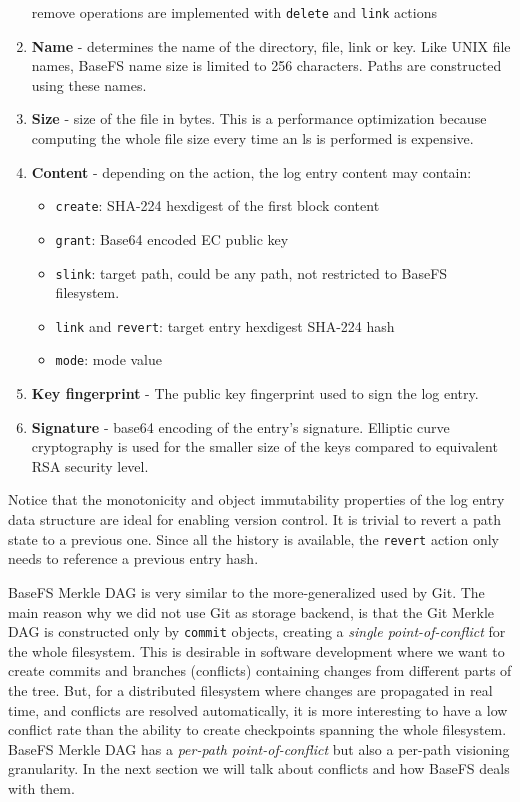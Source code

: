 \documentclass{sig-alternate}
\begin{document}
\begin{enumerate}
remove operations are implemented with \texttt{delete} and \texttt{link} actions
\item \textbf{Name} - determines the name of the directory, file, link or key. Like UNIX file names, BaseFS name size is limited to 256 characters. Paths are constructed using these names.
\item \textbf{Size} - size of the file in bytes. This is a performance optimization because computing the whole file size every time an ls is performed is expensive.
\item \textbf{Content} - depending on the action, the log entry content may contain:
    \begin{itemize}
    \item \texttt{create}: SHA-224 hexdigest of the first block content
    \item \texttt{grant}: Base64 encoded EC public key
    \item \texttt{slink}: target path, could be any path, not restricted to BaseFS filesystem.
    \item \texttt{link} and \texttt{revert}: target entry hexdigest SHA-224 hash
    \item \texttt{mode}: mode value
    \end{itemize}
\item \textbf{Key fingerprint} - The public key fingerprint used to sign the log entry.
\item \textbf{Signature} - base64 encoding of the entry's signature. Elliptic curve cryptography is used for the smaller size of the keys compared to equivalent RSA security level.
\end{enumerate}

Notice that the monotonicity and object immutability properties of the log entry data structure are ideal for enabling version control. It is trivial to revert a path state to a previous one. Since all the history is available, the \texttt{revert} action only needs to reference a previous entry hash.

BaseFS Merkle DAG is very similar to the more-generalized used by Git. The main reason why we did not use Git as storage backend, is that the Git Merkle DAG is constructed only by \texttt{commit} objects, creating a \textit{single point-of-conflict} for the whole filesystem. This is desirable in software development where we want to create commits and branches (conflicts) containing changes from different parts of the tree. But, for a distributed filesystem where changes are propagated in real time, and conflicts are resolved automatically, it is more interesting to have a low conflict rate than the ability to create checkpoints spanning the whole filesystem. BaseFS Merkle DAG has a \textit{per-path point-of-conflict} but also a per-path visioning granularity. In the next section we will talk about conflicts and how BaseFS deals with them.
\end{document}
